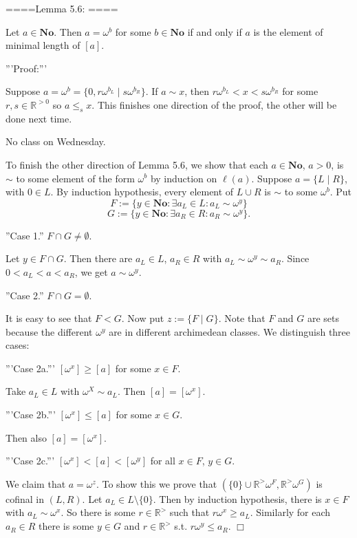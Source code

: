 ====Lemma 5.6: ====

Let $a\in \mathbf{No}$. Then $a=\omega^b$ for some $b\in\mathbf{No}$ if and only if $a$ is the element of minimal length of $[a]$.

'''Proof:'''

Suppose $a=\omega^b=\{0,r\omega^{b_L}\mid s\omega^{b_R}\}$. If $a\sim x$, then $r\omega^{b_L}<x<s\omega^{b_R}$ for some $r,s\in\mathbb{R}^{>0}$ so $a\le_s x$. This finishes one direction of the proof, the other will be done next time.

No class on Wednesday. 

To finish the other direction of Lemma 5.6, we show that each $a\in\mathbf{No}$, $a>0$, is $\sim$ to some element of the form $\omega^b$ by induction on $\ell(a)$. Suppose $a=\{L\mid R\}$, with $0\in L$. By induction hypothesis, every element of $L\cup R$ is $\sim$ to some $\omega^b$. Put
$$F:=\{y\in\mathbf{No}:\exists a_L\in L:a_L\sim \omega^y\}$$
$$G:=\{y\in\mathbf{No}:\exists a_R\in R:a_R\sim \omega^y\}.$$

''Case 1.'' $F\cap G\neq \emptyset$. 

Let $y\in F\cap G$. Then there are $a_L\in L$, $a_R\in R$ with $a_L\sim\omega^y\sim a_R$. Since $0<a_L<a<a_R$, we get $a\sim \omega^y$.

''Case 2.'' $F\cap G=\emptyset$. 

It is easy to see that $F<G$. Now put $z:=\{F\mid G\}$. Note that $F$ and $G$ are sets because the different $\omega^y$ are in different archimedean classes. We distinguish three cases:

'''Case 2a.''' $[\omega^x]\ge [a]$ for some $x\in F$.

Take $a_L\in L$ with $\omega^X\sim a_L$. Then $[a]=[\omega^x]$.

'''Case 2b.''' $[\omega^x]\le [a]$ for some $x\in G$.

Then also $[a]=[\omega^x]$.

'''Case 2c.''' $[\omega^x]<[a]<[\omega^y]$ for all $x\in F$, $y\in G$.

We claim that $a=\omega^z$. To show this we prove that $(\{0\}\cup \mathbb{R}^> \omega^F, \mathbb{R}^>\omega^G)$ is cofinal in $(L,R)$. Let $a_L \in L\setminus \{0\}$. Then by induction hypothesis, there is $x\in F$ with $a_L\sim \omega^x$. So there is some $r\in \mathbb{R}^>$ such that $r\omega^x\ge a_L$. Similarly for each $a_R\in R$ there is some $y\in G$ and $r\in \mathbb{R}^>$ s.t. $r\omega^y\le a_R$. $\Box$

